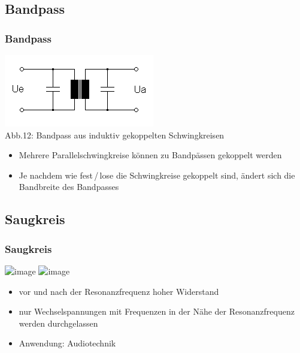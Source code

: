 \subsection*{Bandpass}
\begin{frame}
  \frametitle{Bandpass}
  \begin{center}
    \includegraphics[width=\textwidth,height=.5\textheight,keepaspectratio]{a04/BandpassSpulen.png}\\
    Abb.12: Bandpass aus induktiv gekoppelten Schwingkreisen \cite{wpde}
  \end{center}
  \begin{itemize}
    \item Mehrere Parallelschwingkreise können zu Bandpässen gekoppelt werden
    \item Je nachdem wie fest\,/\,lose die Schwingkreise gekoppelt sind, ändert sich die Bandbreite des Bandpasses
  \end{itemize}
\end{frame}

\subsection*{Saugkreis}
\begin{frame}
  \frametitle{Saugkreis}
  \begin{center}
    \includegraphics<1>[width=\textwidth,height=.5\textheight,keepaspectratio]{e07/Saugkreis.png}
    \includegraphics<2>[width=\textwidth,height=.5\textheight,keepaspectratio]{e07/SerirenschwSig.png}
  \end{center}
  \pause
  \begin{itemize}
    \item vor und nach der Resonanzfrequenz hoher Widerstand
    \item nur Wechselspannungen mit Frequenzen in der Nähe der Resonanzfrequenz werden durchgelassen
    \item Anwendung: Audiotechnik
  \end{itemize}
\end{frame}

